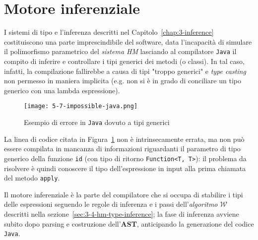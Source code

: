 \section{Motore inferenziale}
\label{sec:5-7-inference-engine}

I sistemi di tipo e l'inferenza descritti nel Capitolo~\ref{chap:3-inference} costituiscono una parte imprescindibile del software,
data l'incapacità di simulare il polimorfismo parametrico del \textit{sistema HM} lasciando al compilatore \texttt{Java}
il compito di inferire e controllare i tipi generici dei metodi (o classi).
In tal caso, infatti, la compilazione fallirebbe a causa di tipi "troppo generici" e \textit{type casting} non permesso
in maniera implicita (e.g. non si è in grado di conciliare un tipo generico con una lambda espressione).

\begin{figure}
    \vspace{4mm}
    \texttt{[image: 5-7-impossible-java.png]}
    \caption{Esempio di errore in \texttt{Java} dovuto a tipi generici}
    \label{fig:5-7-impossible-java}
    \vspace{4mm}
\end{figure}

\noindent La linea di codice citata in Figura~\ref{fig:5-7-impossible-java} non è intrinsecamente errata,
ma non può essere compilata in mancanza di informazioni riguardanti il parametro di tipo generico della funzione \texttt{id}
(con tipo di ritorno \texttt{Function<T, T>}): il problema da risolvere è quindi conoscere il tipo dell'espressione
in input alla prima chiamata del metodo \texttt{apply}.


Il motore inferenziale è la parte del compilatore che si occupa di stabilire i tipi delle espressioni seguendo le regole
di inferenza e i passi dell'\textit{algoritmo $\mathcal{W}$} \cite{Grabmuller-2006-AlgorithmW}
descritti nella sezione~\ref{sec:3-4-hm-type-inference}; la fase di inferenza avviene subito dopo parsing
e costruzione dell'\textbf{AST}, anticipando la generazione del codice \texttt{Java}.



\newpage

